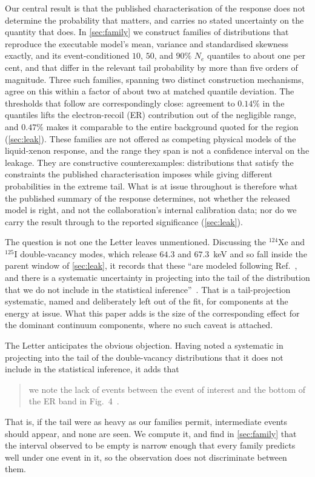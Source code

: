 \documentclass[11pt,a4paper]{article}
\begin{document}
Our central result is that the published characterisation of the
response does not determine the probability that matters, and carries no
stated uncertainty on the quantity that does. In \cref{sec:family} we
construct families of distributions that reproduce the executable
model's mean, variance and standardised skewness exactly, and its
event-conditioned \(10\), \(50\), and \(90\%\) \(N_e\) quantiles to about
one per cent, and that differ in the relevant tail probability by more
than five orders of magnitude. Three such families, spanning two
distinct construction mechanisms, agree on this within a factor of about
two at matched quantile deviation. The thresholds that follow are
correspondingly close: agreement to \(0.14\%\) in the quantiles lifts
the electron-recoil (ER) contribution out of the negligible range, and
\(0.47\%\) makes it comparable to the entire background quoted for the
region (\cref{sec:leak}). These families are not offered as competing
physical models of the liquid-xenon response, and the range they span is
not a confidence interval on the leakage. They are constructive
counterexamples: distributions that satisfy the constraints the
published characterisation imposes while giving different probabilities
in the extreme tail. What is at issue throughout is therefore what the
published summary of the response determines, not whether the released
model is right, and not the collaboration's internal calibration data;
nor do we carry the result through to the reported significance
(\cref{sec:leak}).

The question is not one the Letter leaves unmentioned. Discussing the
\(^{124}\)Xe and \(^{125}\)I double-vacancy modes, which release
\(64.3\) and \(67.3\)~keV and so fall inside the parent window of
\cref{sec:leak}, it records that these ``are modeled following
Ref.~\cite{Recomb}, and there is a systematic uncertainty in projecting
into the tail of the distribution that we do not include in the
statistical inference''~\cite{LZ:2026axp}. That is a tail-projection
systematic, named and deliberately left out of the fit, for components
at the energy at issue. What this paper adds is the size of the
corresponding effect for the dominant continuum components, where no
such caveat is attached.

The Letter anticipates the obvious objection. Having noted a systematic
in projecting into the tail of the double-vacancy distributions that it
does not include in the statistical inference, it adds that
\begin{quote}
    we note the lack of events between the event of interest and the
    bottom of the ER band in Fig.~4~\cite{LZ:2026axp}.
\end{quote}
That is, if the tail were as heavy as our families permit, intermediate
events should appear, and none are seen. We compute it, and find in
\cref{sec:family} that the interval observed to be empty is narrow
enough that every family predicts well under one event in it, so the
observation does not discriminate between them. 
\end{document}

